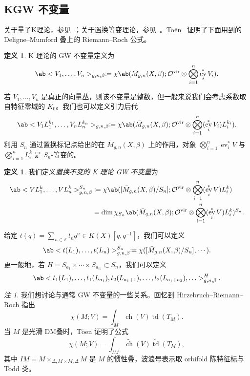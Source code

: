 \documentclass{amsart}
\theoremstyle{definition}
\newtheorem{defn}[thm]{定义}
\theoremstyle{remark}
\newtheorem{rmk}[thm]{注}
\theoremstyle{plain}
\theoremstyle{definition}
\theoremstyle{remark}
\newcommand{\Z}{\mathbb{Z}}
\newcommand{\mc}[1]{\mathcal{#1}}
\newcommand{\mr}[1]{\mathrm{#1}}
\newcommand{\on}[1]{\operatorname{#1}}
\newcommand{\wt}[1]{\widetilde{#1}}
\newcommand{\1}{\mathbf{1}}
\newcommand{\2}{\mathbf{2}}
\newcommand{\3}{\mathbf{3}}
\newcommand{\vir}{\mr{vir}}
\DeclareMathOperator{\ev}{ev}
\begin{document}
\subsection{KGW 不变量}%
\label{sub:KGW invariants}

关于量子K理论，参见~\cite{Lee2004}；关于置换等变理论，参见~\cite{Givental2017K1,GiventalK7}。To\"en~\cite{Toen1999} 证明了下面用到的 Deligne--Mumford 叠上的 Riemann--Roch 公式。

\begin{defn}
    K 理论的 GW 不变量定义为
    \[ \ab<V_1, \ldots, V_n>_{g,n,\beta} \coloneqq \chi\ab(\bar{M}_{g,n}(X, \beta); \mc{O}^{\vir} \otimes \bigotimes_{i=1}^n \ev_i^* V_i). \]
\end{defn}

若 \(V_1, \ldots, V_n\) 是真正的向量丛，则该不变量是整数，但一般来说我们会考虑系数取自特征零域的 \(K_0\)。我们也可以定义引力后代
\[ \ab<V_1 L_1^{k_1}, \ldots, V_n L_n^{k_n}>_{g,n,\beta} \coloneqq \chi\ab(\bar{M}_{g,n}(X, \beta); \mc{O}^{\vir} \otimes \bigotimes_{i=1}^n ( \ev_i^* V_i )L_i^{k_i} ). \]
利用 \(S_n\) 通过置换标记点给出的在 \(\bar{M}_{g,n}(X, \beta)\) 上的作用，对象 \(\bigotimes_{i=1}^n \ev_i^* V\) 与 \(\bigotimes_{i=1}^n L_i^k\) 是 \(S_n\)-等变的。

\begin{defn}
    我们定义\textit{置换不变的 K 理论 GW 不变量}为
    \begin{align*}
        \ab<V L_1^k, \ldots, V L_n^k>_{g,n,\beta}^{S_n} &\coloneqq \chi\ab([ \bar{M}_{g,n}(X, \beta)/S_n ]; \mc{O}^{\vir} \otimes \bigotimes_{i=1}^n ( \ev_i^* V ) L_i^k) \\
        &= \dim \chi_{S_n} \ab(\bar{M}_{g,n}(X, \beta); \mc{O}^{\vir} \otimes \bigotimes_{i=1}^n ( \ev_i^* V ) L_i^k )^{S_n}.
    \end{align*}
\end{defn}

给定 \(t(q) = \sum_{n \in \Z} t_n q^n \in K(X)[q,q^{-1}]\)，我们可以定义
\[ \ab< t(L_1), \ldots, t(L_n)>^{S_n}_{g,n,\beta} \coloneqq \chi ([\bar{M}_{g,n}(X,\beta)/S_n], \cdots). \]
更一般地，若 \(H = S_{a_1} \times \cdots \times S_{a_m} \subset S_n\)，我们可以定义
\[ \ab<t_1(L_1), \ldots, t_1(L_{a_1}), t_2(L_{a_1+1}), \ldots, t_2(L_{a_1+a_2}), \ldots>_{g,n,\beta}^H. \]

\begin{rmk}
    我们想讨论与通常 GW 不变量的一些关系。回忆到 Hirzebruch--Riemann--Roch 指出
    \[ \chi(M; V) = \int_M \on{ch}(V) \on{td}(T_M). \]
    当 \(M\) 是光滑 DM叠时，T\"oen 证明了公式
    \[ \chi(M; V) = \int_{IM} \wt{\on{ch}}(V) \wt{\on{td}}(T_M), \]
    其中 \(IM = M \times_{\Delta, M \times M, \Delta} M\) 是 \(M\) 的惯性叠，波浪号表示取 orbifold 陈特征标与 Todd 类。 
\end{rmk}
\end{document}
